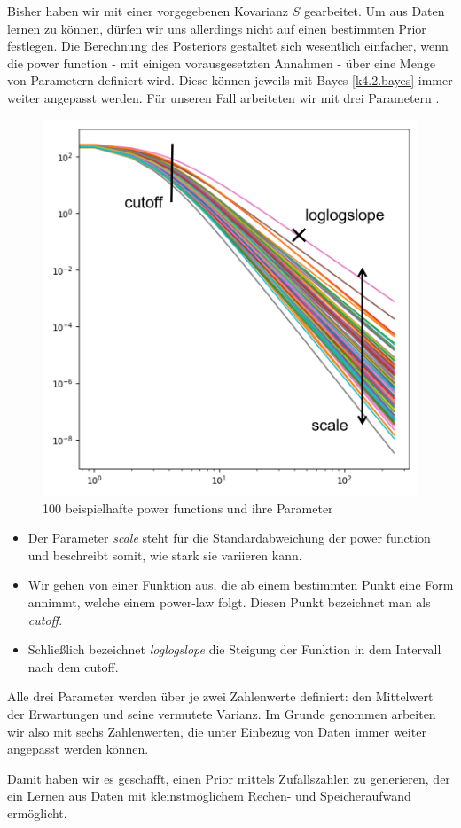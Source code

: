 Bisher haben wir mit einer vorgegebenen Kovarianz $S$ gearbeitet. Um aus Daten lernen zu können, dürfen wir uns allerdings nicht auf einen bestimmten Prior festlegen. Die Berechnung des Posteriors gestaltet sich wesentlich einfacher, wenn die power function - mit einigen vorausgesetzten Annahmen - über eine Menge von Parametern definiert wird. Diese können jeweils mit Bayes \cref{k4.2.bayes} immer weiter angepasst werden. Für unseren Fall arbeiteten wir mit drei Parametern %
.
\begin{figure}[h] 
    \centering
    \includegraphics{k4.2/power_function_bearbeitet.png}
    \caption{100 beispielhafte power functions und ihre Parameter}
\end{figure}
\begin{itemize}
    \item Der Parameter \emph{scale} steht für die Standardabweichung der power function und beschreibt somit, wie stark sie variieren kann.
    \item Wir gehen von einer Funktion aus, die ab einem bestimmten Punkt eine Form annimmt, welche einem power-law folgt. Diesen Punkt bezeichnet man als \emph{cutoff}.
    \item Schließlich bezeichnet \emph{loglogslope} die Steigung der Funktion in dem Intervall nach dem cutoff.
\end{itemize}
Alle drei Parameter werden über je zwei Zahlenwerte definiert: den Mittelwert der Erwartungen und seine vermutete Varianz. Im Grunde genommen arbeiten wir also mit sechs Zahlenwerten, die unter Einbezug von Daten immer weiter angepasst werden können.

Damit haben wir es geschafft, einen Prior mittels Zufallszahlen zu generieren, der ein Lernen aus Daten mit kleinstmöglichem Rechen- und Speicheraufwand ermöglicht.